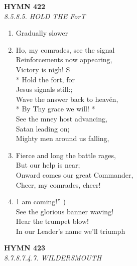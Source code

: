 \documentclass[11pt,a4paper]{article}
\begin{document}
\newpage
\begin{center}
    {\Large \textbf{HYMN 422}}
    \\
    \textit{8.5.8.5. HOLD THE ForT}
\end{center}
\vspace{1em}

\begin{enumerate}
    \item Gradually slower

    \item Ho, my comrades, see the signal \\
        Reinforcements now appearing, \\
        Victory is nigh! S \\
        * Hold the fort, for \\
        Jesus signals still:; \\
        Wave the answer back to heavén, \\
        * By Thy grace we will! * \\
        See the mney host advancing, \\
        Satan leading on; \\
        Mighty men around us falling,

    \item Fierce and long the battle rages, \\
        But our help is near; \\
        Onward comes our great Commander, \\
        Cheer, my comrades, cheer!

    \item 1 am coming!'' ) \\
        See the glorious banner waving! \\
        Hear the trumpet blow! \\
        In our Leader's name we'll triumph

\end{enumerate}

\newpage
\begin{center}
    {\Large \textbf{HYMN 423}}
    \\
    \textit{8.7.8.7.4.7. WILDERSMOUTH}
\end{center}
\vspace{1em}
\end{document}
